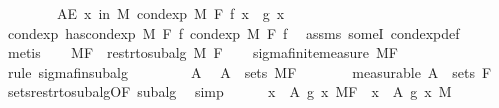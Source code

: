 \begin{isabellebody}
\ \ \ \ \ \ \ \ {\isachardoublequoteopen}AE\ x\ in\ M{\isachardot}{\kern0pt}\ cond{\isacharunderscore}{\kern0pt}exp\ M\ F\ f\ x\ {\isacharequal}{\kern0pt}\ g\ x{\isachardoublequoteclose}\isanewline
%
\isadelimproof
%
\endisadelimproof
%
\isatagproof
{}\isamarkupfalse%
\ {\isacharminus}{\kern0pt}\isanewline
\ \ \isamarkupfalse%
\ cond{\isacharunderscore}{\kern0pt}exp{\isacharcolon}{\kern0pt}\ {\isachardoublequoteopen}has{\isacharunderscore}{\kern0pt}cond{\isacharunderscore}{\kern0pt}exp\ M\ F\ f\ {\isacharparenleft}{\kern0pt}cond{\isacharunderscore}{\kern0pt}exp\ M\ F\ f{\isacharparenright}{\kern0pt}{\isachardoublequoteclose}\ \isamarkupfalse%
\ assms\ someI\ cond{\isacharunderscore}{\kern0pt}exp{\isacharunderscore}{\kern0pt}def\ \isamarkupfalse%
\ metis\isanewline
\ \ \isamarkupfalse%
\ {\isacharquery}{\kern0pt}MF\ {\isacharequal}{\kern0pt}\ {\isachardoublequoteopen}restr{\isacharunderscore}{\kern0pt}to{\isacharunderscore}{\kern0pt}subalg\ M\ F{\isachardoublequoteclose}\isanewline
\ \ \isamarkupfalse%
\ sigma{\isacharunderscore}{\kern0pt}finite{\isacharunderscore}{\kern0pt}measure\ {\isacharquery}{\kern0pt}MF\ \isamarkupfalse%
\ {\isacharparenleft}{\kern0pt}rule\ sigma{\isacharunderscore}{\kern0pt}fin{\isacharunderscore}{\kern0pt}subalg{\isacharparenright}{\kern0pt}\isanewline
\ \ \isacommand{{\isacharbraceleft}{\kern0pt}}\isamarkupfalse%
\isanewline
\ \ \ \ \isamarkupfalse%
\ A\ \isamarkupfalse%
\ {\isachardoublequoteopen}A\ {\isasymin}\ sets\ {\isacharquery}{\kern0pt}MF{\isachardoublequoteclose}\isanewline
\ \ \ \ \isamarkupfalse%
\ \isamarkupfalse%
\ {\isacharbrackleft}{\kern0pt}measurable{\isacharbrackright}{\kern0pt}{\isacharcolon}{\kern0pt}\ {\isachardoublequoteopen}A\ {\isasymin}\ sets\ F{\isachardoublequoteclose}\ \isamarkupfalse%
\ sets{\isacharunderscore}{\kern0pt}restr{\isacharunderscore}{\kern0pt}to{\isacharunderscore}{\kern0pt}subalg{\isacharbrackleft}{\kern0pt}OF\ subalg{\isacharbrackright}{\kern0pt}\ \isamarkupfalse%
\ simp\isanewline
\ \ \ \ \isamarkupfalse%
\ {\isachardoublequoteopen}{\isacharparenleft}{\kern0pt}{\isasymintegral}x\ {\isasymin}\ A{\isachardot}{\kern0pt}\ g\ x\ {\isasympartial}{\isacharquery}{\kern0pt}MF{\isacharparenright}{\kern0pt}\ {\isacharequal}{\kern0pt}\ {\isacharparenleft}{\kern0pt}{\isasymintegral}x\ {\isasymin}\ A{\isachardot}{\kern0pt}\ g\ x\ {\isasympartial}M{\isacharparenright}{\kern0pt}{\isachardoublequoteclose}\ \isamarkupfalse%

\end{isabellebody}
